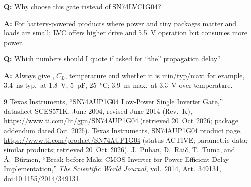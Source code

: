 \documentclass[11pt,a4paper]{article}
\newcommand{\qa}[2]{\par\smallskip\textbf{Q:} #1\par\textbf{A:} #2\par}
\begin{document}
\qa{Why choose this gate instead of SN74LVC1G04?}
   {For battery-powered products where power and tiny packages matter and loads are small; LVC offers higher drive and \SI{5.5}{\volt} operation but consumes more power.}

\qa{Which numbers should I quote if asked for ``the'' propagation delay?}
   {Always give \Vcc, $C_L$, temperature and whether it is min/typ/max: for example, \SI{3.4}{\nano\second} typ.\ at \SI{1.8}{\volt}, \SI{5}{\pico\farad}, \SI{25}{\celsius}; \SI{3.9}{\nano\second} max.\ at \SI{3.3}{\volt} over temperature.}

\begin{thebibliography}{9}
   Texas Instruments, ``SN74AUP1G04 Low-Power Single Inverter Gate,'' datasheet SCES571K, June 2004, revised June 2014 (Rev.~K), \url{https://www.ti.com/lit/gpn/SN74AUP1G04} (retrieved 20~Oct~2026; package addendum dated Oct~2025).
   Texas Instruments, SN74AUP1G04 product page, \url{https://www.ti.com/product/SN74AUP1G04} (status ACTIVE; parametric data; similar products; retrieved 20~Oct~2026).
   J.~Puhan, D.~Rai\v{c}, T.~Tuma, and \'A.~B\H{u}rmen, ``Break-before-Make CMOS Inverter for Power-Efficient Delay Implementation,'' \emph{The Scientific World Journal}, vol.~2014, Art.~349131, doi:\href{https://doi.org/10.1155/2014/349131}{10.1155/2014/349131}.
\end{thebibliography}
\end{document}
